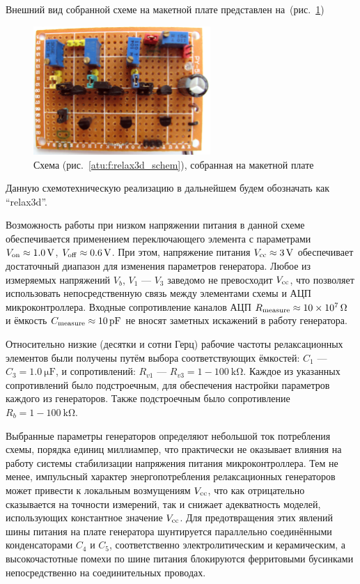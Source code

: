 Внешний вид собранной схеме на макетной плате представлен на~(рис.~\ref{atu:f:relax3d_board})

\begin{figure}[htb!]
  \centerline{\includegraphics[width=0.6\textwidth]{p/relax3d_board.jpg} }
  \caption{Схема (рис.~\ref{atu:f:relax3d_schem}), собранная на макетной плате}
  \label{atu:f:relax3d_board}
\end{figure}

Данную схемотехническую реализацию в дальнейшем будем обозначать как ``relax3d''.

Возможность работы при низком напряжении питания в данной схеме обеспечивается
применением переключающего элемента с параметрами
$V_\mathrm{on} \approx \SI{1.0}{\volt}$,
$V_\mathrm{off} \approx \SI{0.6}{\volt}$.
При этом, напряжение питания $V_\mathrm{cc} \approx \SI{3}{\volt}$
обеспечивает достаточный диапазон для изменения параметров генератора.
Любое из измеряемых напряжений $V_b$, $V_1$ --- $V_3$
заведомо не превосходит $V_\mathrm{cc}$,
что позволяет использовать непосредственную связь
между элементами схемы и АЦП микроконтроллера.
Входные сопротивление каналов АЦП $R_\mathrm{measure} \approx \SI{10e7}{\ohm}$
и ёмкость $C\Tidx{measure} \approx \SI{10}{\pico\farad} $
не вносят заметных искажений в работу генератора.

Относительно низкие (десятки и сотни Герц) рабочие частоты
релаксационных элементов были получены путём выбора соответствующих
ёмкостей:
$C_1$ --- $C_3 = \SI{1.0}{\micro\farad}$,
и сопротивлений:
$R_{v1}$ --- $R_{v3} = 1-\SI{100}{\kilo\ohm}$.
Каждое из указанных сопротивлений было подстроечным, для обеспечения
настройки параметров каждого из генераторов. Также подстроечным было сопротивление
$ R_{b} = 1-\SI{100}{\kilo\ohm}$.

Выбранные параметры генераторов определяют небольшой ток
потребления схемы, порядка единиц миллиампер, что
практически не оказывает влияния на работу
системы стабилизации напряжения питания микроконтроллера.
Тем не менее, импульсный характер энергопотребления
релаксационных генераторов может привести
к локальным возмущениям $V_\mathrm{cc}$, что
как отрицательно сказывается на точности измерений,
так и снижает адекватность моделей, использующих
константное значение $V_\mathrm{cc}$.
Для предотвращения этих явлений шины питания на плате генератора
шунтируется параллельно соединёнными конденсаторами $C_4$ и $C_5$,
соответственно электролитическим и керамическим,
а высокочастотные помехи по шине питания блокируются
ферритовыми бусинками непосредственно на соединительных проводах.

